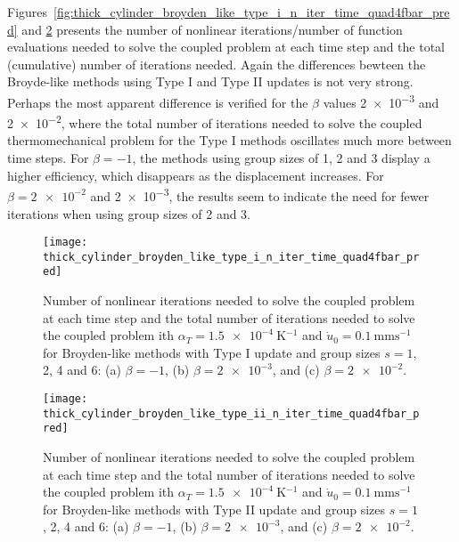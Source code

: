 Figures~\ref{fig:thick_cylinder_broyden_like_type_i_n_iter_time_quad4fbar_pred} and \ref{fig:thick_cylinder_broyden_like_type_ii_n_iter_time_quad4fbar_pred} presents the number of nonlinear iterations/number of function evaluations needed to solve the coupled problem at each time step and the total (cumulative) number of iterations needed.
Again the differences bewteen the Broyde-like methods using Type I and Type II updates is not very strong.
Perhaps the most apparent difference is verified for the \(\beta\) values \num{2e-3} and \num{2e-2}, where the total number of iterations needed to solve the coupled thermomechanical problem for the Type I methods oscillates much more between time steps.
For \(\beta=-1\), the methods using group sizes of 1, 2 and 3 display a higher efficiency, which disappears as the displacement increases.
For \(\beta=\num{2e-2}\) and \num{2e-3}, the results seem to indicate the need for fewer iterations when using group sizes of 2 and 3.

\begin{figure}[htbp]
  \texttt{[image: thick\_cylinder\_broyden\_like\_type\_i\_n\_iter\_time\_quad4fbar\_pred]}
  \caption{Number of nonlinear iterations needed to solve the coupled problem at each time step and the total number of iterations needed to solve the coupled problem ith \(\alpha_T=\SI{1.5e-4}{\kelvin^{-1}}\) and \(\dot u_0 =\SI{0.1}{\milli\meter\second^{-1}}\) for Broyden-like methods with Type I update and group sizes \(s=1\), 2, 4 and 6: (a) \(\beta=-1\), (b) \(\beta=\num{2e-3}\), and (c) \(\beta=\num{2e-2}\).}
\label{thick_cylinder_broyden_like_type_i_n_iter_time_quad4fbar_pred}
\end{figure}

\begin{figure}[htbp]
  \texttt{[image: thick\_cylinder\_broyden\_like\_type\_ii\_n\_iter\_time\_quad4fbar\_pred]}
  \caption{Number of nonlinear iterations needed to solve the coupled problem at each time step and the total number of iterations needed to solve the coupled problem ith \(\alpha_T=\SI{1.5e-4}{\kelvin^{-1}}\) and \(\dot u_0 =\SI{0.1}{\milli\meter\second^{-1}}\) for Broyden-like methods with Type II update and group sizes \(s=1\), 2, 4 and 6: (a) \(\beta=-1\), (b) \(\beta=\num{2e-3}\), and (c) \(\beta=\num{2e-2}\).}
\label{fig:thick_cylinder_broyden_like_type_ii_n_iter_time_quad4fbar_pred}
\end{figure}

